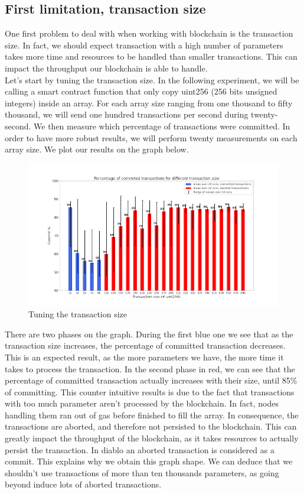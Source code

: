 \documentclass{article}
\begin{document}
\subsection{First limitation, transaction size}
One first problem to deal with when working with blockchain is the transaction size. In fact, we should expect
transaction with a high number of parameters takes more time and resources to be handled than smaller transactions. This
can impact the throughput our blockchain is able to handle.\\
Let's start by tuning the transaction size. In the following experiment, we will be calling a smart contract function
that only copy uint256 (256 bits unsigned integers) inside an array. For each array size ranging from one thousand
to fifty thousand, we will send one hundred transactions per second during twenty-second. We then measure which percentage of transactions were committed. In order to have more robust
results, we will perform twenty measurements on each array size. We plot our results on the graph below.
\begin{figure}[H]
    \hspace*{-1.55cm}
    \includegraphics[scale=0.75]{max_array_length}
    \hspace{2mm}%
    \caption{Tuning the transaction size}
\end{figure}
There are two phases on the graph. During the first blue one we see that as the transaction size increases, the percentage of committed transaction decreases.
This is an expected result, as the more parameters we have, the more time it takes to process the transaction.
In the second phase in red, we can see that the percentage of committed transaction actually increases with their size,
until 85\% of committing. This counter intuitive results is due to the fact that transactions with too much parameter
aren't processed by the blockchain. In fact, nodes handling them ran out of gas before finished to fill the array.
In consequence, the transactions are aborted, and therefore not persisted to the blockchain. This can greatly impact
the throughput of the blockchain, as it takes resources to actually persist the transaction. In diablo an aborted
transaction is considered as a commit. This explains why we obtain this graph shape. We can deduce that we shouldn't
use transactions of more than ten thousands parameters, as going beyond induce lots of aborted transactions.
\end{document}
